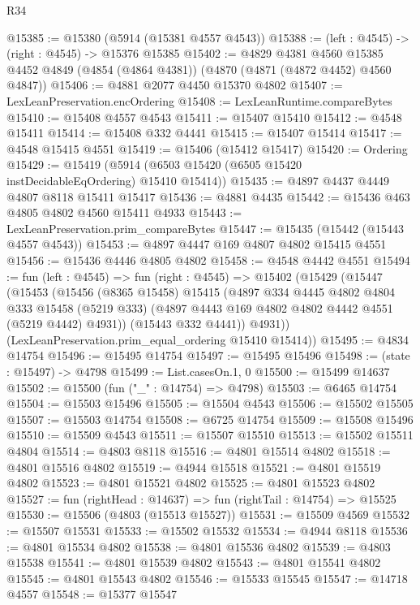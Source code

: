 \begin{lexlean}{R34}
\begin{coremodule}
@15385 := @15380 (@5914 (@15381 @4557 @4543))
@15388 := (left : @4545) -> (right : @4545) -> @15376 @15385
@15402 := @4829
    @4381
    @4560
    @15385
    @4452
    @4849
    (@4854 (@4864 @4381))
    (@4870 (@4871 (@4872 @4452) @4560 @4847))
@15406 := @4881 @2077 @4450 @15370 @4802
@15407 := LexLeanPreservation.encOrdering
@15408 := LexLeanRuntime.compareBytes
@15410 := @15408 @4557 @4543
@15411 := @15407 @15410
@15412 := @4548 @15411
@15414 := @15408 @332 @4441
@15415 := @15407 @15414
@15417 := @4548 @15415 @4551
@15419 := @15406 (@15412 @15417)
@15420 := Ordering
@15429 := @15419 (@5914 (@6503 @15420 (@6505 @15420 instDecidableEqOrdering) @15410 @15414))
@15435 := @4897 @4437 @4449 @4807 @8118 @15411 @15417
@15436 := @4881 @4435
@15442 := @15436 @463 @4805 @4802 @4560 @15411 @4933
@15443 := LexLeanPreservation.prim_compareBytes
@15447 := @15435 (@15442 (@15443 @4557 @4543))
@15453 := @4897 @4447 @169 @4807 @4802 @15415 @4551
@15456 := @15436 @4446 @4805 @4802
@15458 := @4548 @4442 @4551
@15494 := fun (left : @4545) =>
  fun (right : @4545) =>
  @15402
    (@15429
      (@15447
        (@15453
          (@15456
            (@8365 @15458)
            @15415
            (@4897
              @334
              @4445
              @4802
              @4804
              @333
              @15458
              (@5219 @333)
              (@4897 @4443 @169 @4802 @4802 @4442 @4551 (@5219 @4442) @4931))
            (@15443 @332 @4441))
          @4931))
      (LexLeanPreservation.prim_equal_ordering @15410 @15414))
@15495 := @4834 @14754
@15496 := @15495 @14754
@15497 := @15495 @15496
@15498 := (state : @15497) -> @4798
@15499 := List.casesOn.{1, 0}
@15500 := @15499 @14637
@15502 := @15500 (fun ("_" : @14754) => @4798)
@15503 := @6465 @14754
@15504 := @15503 @15496
@15505 := @15504 @4543
@15506 := @15502 @15505
@15507 := @15503 @14754
@15508 := @6725 @14754
@15509 := @15508 @15496
@15510 := @15509 @4543
@15511 := @15507 @15510
@15513 := @15502 @15511 @4804
@15514 := @4803 @8118
@15516 := @4801 @15514 @4802
@15518 := @4801 @15516 @4802
@15519 := @4944 @15518
@15521 := @4801 @15519 @4802
@15523 := @4801 @15521 @4802
@15525 := @4801 @15523 @4802
@15527 := fun (rightHead : @14637) => fun (rightTail : @14754) => @15525
@15530 := @15506 (@4803 (@15513 @15527))
@15531 := @15509 @4569
@15532 := @15507 @15531
@15533 := @15502 @15532
@15534 := @4944 @8118
@15536 := @4801 @15534 @4802
@15538 := @4801 @15536 @4802
@15539 := @4803 @15538
@15541 := @4801 @15539 @4802
@15543 := @4801 @15541 @4802
@15545 := @4801 @15543 @4802
@15546 := @15533 @15545
@15547 := @14718 @4557
@15548 := @15377 @15547

\end{coremodule}
\end{lexlean}
